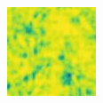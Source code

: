 \documentclass[conference]{IEEEtran}
\begin{document}
\begin{figure}[!t]
        \vfill
        \includegraphics[width=\linewidth]{Figures/906/906_proposed_ssim.jpg}
        
    \endminipage\hfill


\end{figure}
\end{document}
